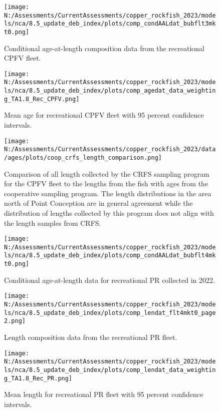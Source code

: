 \documentclass[11pt,
  english,
  letterpaper,
]{article}
\begin{document}
\begin{figure}
\centering
\texttt{[image: N:/Assessments/CurrentAssessments/copper\_rockfish\_2023/models/nca/8.5\_update\_deb\_index/plots/comp\_condAALdat\_bubflt3mkt0.png]}
\caption{Conditional age-at-length composition data from the recreational CPFV fleet.\label{fig:rec-cpfv-caal-data}}
\end{figure}

\begin{figure}
\centering
\texttt{[image: N:/Assessments/CurrentAssessments/copper\_rockfish\_2023/models/nca/8.5\_update\_deb\_index/plots/comp\_agedat\_data\_weighting\_TA1.8\_Rec\_CPFV.png]}
\caption{Mean age for recreational CPFV fleet with 95 percent confidence intervals.\label{fig:mean-rec-cpfv-age-data}}
\end{figure}

\begin{figure}
\centering
\texttt{[image: N:/Assessments/CurrentAssessments/copper\_rockfish\_2023/data/ages/plots/coop\_crfs\_length\_comparison.png]}
\caption{Comparison of all length collected by the CRFS sampling program for the CPFV fleet to the lengths from the fish with ages from the cooperative sampling program. The length distributions in the area north of Point Conception are in general agreement while the distribution of lengths collected by this program does not align with the length samples from CRFS.\label{fig:coop-len-comparison}}
\end{figure}

\begin{figure}
\centering
\texttt{[image: N:/Assessments/CurrentAssessments/copper\_rockfish\_2023/models/nca/8.5\_update\_deb\_index/plots/comp\_condAALdat\_bubflt4mkt0.png]}
\caption{Conditional age-at-length data for recreational PR collected in 2022.\label{fig:rec-pr-caal-data}}
\end{figure}

\begin{figure}
\centering
\texttt{[image: N:/Assessments/CurrentAssessments/copper\_rockfish\_2023/models/nca/8.5\_update\_deb\_index/plots/comp\_lendat\_flt4mkt0\_page2.png]}
\caption{Length composition data from the recreational PR fleet.\label{fig:rec-pr-len-data}}
\end{figure}

\begin{figure}
\centering
\texttt{[image: N:/Assessments/CurrentAssessments/copper\_rockfish\_2023/models/nca/8.5\_update\_deb\_index/plots/comp\_lendat\_data\_weighting\_TA1.8\_Rec\_PR.png]}
\caption{Mean length for recreational PR fleet with 95 percent confidence intervals.\label{fig:mean-rec-pr-len-data}}
\end{figure}
\end{document}

